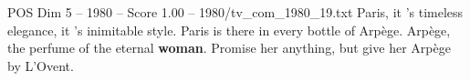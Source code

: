 \begin{textsample}{POS Dim 5 – 1980 – Score 1.00 – 1980/tv\_com\_1980\_19.txt}  \label{ex:f5_pos_014}
Paris, it 's timeless elegance, it 's inimitable style.
Paris is there in every bottle of Arpège.
Arpège, the perfume of the eternal \textbf{woman}.
Promise her anything, but give her Arpège by L'Ovent.

\end{textsample}
